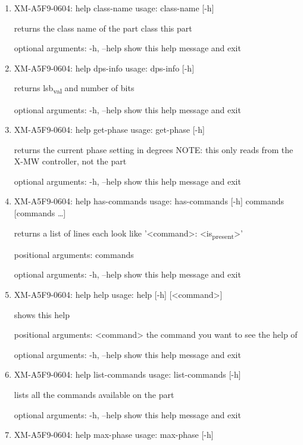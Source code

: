 \documentclass[11pt]{article}
\begin{document}
\begin{enumerate}
\item XM-A5F9-0604: help class-name
\label{sec:orgc32f162}
usage: class-name [-h]

returns the class name of the part class this part

optional arguments:
  -h, --help  show this help message and exit

\item XM-A5F9-0604: help dps-info
\label{sec:orgaaee4d2}
usage: dps-info [-h]

returns lsb\textsubscript{val} and number of bits

optional arguments:
  -h, --help  show this help message and exit

\item XM-A5F9-0604: help get-phase
\label{sec:org844a8fe}
usage: get-phase [-h]

returns the current phase setting in degrees NOTE: this only reads from the
X-MW controller, not the part

optional arguments:
  -h, --help  show this help message and exit

\item XM-A5F9-0604: help has-commands
\label{sec:orge13cbae}
usage: has-commands [-h] commands [commands \ldots{}]

returns a list of lines each look like '<command>: <is\textsubscript{present}>'

positional arguments:
  commands

optional arguments:
  -h, --help  show this help message and exit

\item XM-A5F9-0604: help help
\label{sec:orgcfcbfbd}
usage: help [-h] [<command>]

shows this help

positional arguments:
  <command>   the command you want to see the help of

optional arguments:
  -h, --help  show this help message and exit

\item XM-A5F9-0604: help list-commands
\label{sec:org411c46c}
usage: list-commands [-h]

lists all the commands available on the part

optional arguments:
  -h, --help  show this help message and exit

\item XM-A5F9-0604: help max-phase
\label{sec:org94a5848}
usage: max-phase [-h]


\end{enumerate}
\end{document}

